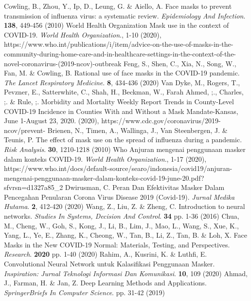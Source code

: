 \documentclass{article}
\begin{document}
\begin{thebibliography}{1}
	Cowling, B., Zhou, Y., Ip, D., Leung, G. \& Aiello, A. Face masks to prevent transmission of influenza virus: a systematic review. {\em Epidemiology And Infection}. \textbf{138}, 449-456 (2010)
	World Health Organization Mask use in the context of COVID-19. {\em World Health Organization}., 1-10 (2020), https://www.who.int/publications/i/item/advice-on-the-use-of-masks-in-the-community-during-home-care-and-in-healthcare-settings-in-the-context-of-the-novel-coronavirus-(2019-ncov)-outbreak
	Feng, S., Shen, C., Xia, N., Song, W., Fan, M. \& Cowling, B. Rational use of face masks in the COVID-19 pandemic. {\em The Lancet Respiratory Medicine}. \textbf{8}, 434-436 (2020)
	Van Dyke, M., Rogers, T., Pevzner, E., Satterwhite, C., Shah, H., Beckman, W., Farah Ahmed, ;., Charles, ;. \& Rule, ;. Morbidity and Mortality Weekly Report Trends in County-Level COVID-19 Incidence in Counties With and Without a Mask Mandate-Kansas, June 1-August 23, 2020.  (2020), https://www.cdc.gov/coronavirus/2019-ncov/prevent-
	Brienen, N., Timen, A., Wallinga, J., Van Steenbergen, J. \& Teunis, P. The effect of mask use on the spread of influenza during a pandemic. {\em Risk Analysis}. \textbf{30}, 1210-1218 (2010)
	Who Anjuran mengenai penggunaan masker dalam konteks COVID-19. {\em World Health Organization}., 1-17 (2020), https://www.who.int/docs/default-source/searo/indonesia/covid19/anjuran-mengenai-penggunaan-masker-dalam-konteks-covid-19-june-20.pdf?sfvrsn=d1327a85_2
	Dwirusman, C. Peran Dan Efektivitas Masker Dalam Pencegahan Penularan Corona Virus Disease 2019 (Covid-19). {\em Jurnal Medika Hutama}. \textbf{2}, 412-420 (2020)
	Wang, Z., Liu, Z. \& Zheng, C. Introduction to neural networks. {\em Studies In Systems, Decision And Control}. \textbf{34} pp. 1-36 (2016)
	Chua, M., Cheng, W., Goh, S., Kong, J., Li, B., Lim, J., Mao, L., Wang, S., Xue, K., Yang, L., Ye, E., Zhang, K., Cheong, W., Tan, B., Li, Z., Tan, B. \& Loh, X. Face Masks in the New COVID-19 Normal: Materials, Testing, and Perspectives. {\em Research}. \textbf{2020} pp. 1-40 (2020)
	Rahim, A., Kusrini, K. \& Luthfi, E. Convolutional Neural Network untuk Kalasifikasi Penggunaan Masker. {\em Inspiration: Jurnal Teknologi Informasi Dan Komunikasi}. \textbf{10}, 109 (2020)
	Ahmad, J., Farman, H. \& Jan, Z. Deep Learning Methods and Applications. {\em SpringerBriefs In Computer Science}. pp. 31-42 (2019)

\end{thebibliography}
\end{document}
